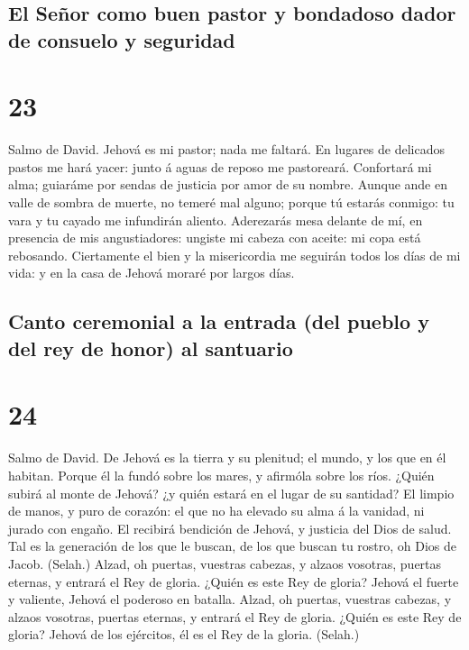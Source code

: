 \hypertarget{el-seuxf1or-como-buen-pastor-y-bondadoso-dador-de-consuelo-y-seguridad}{%
\subsection{El Señor como buen pastor y bondadoso dador de consuelo y
seguridad}\label{el-seuxf1or-como-buen-pastor-y-bondadoso-dador-de-consuelo-y-seguridad}}

\hypertarget{section-22}{%
\section{23}\label{section-22}}

 Salmo de David. Jehová es mi pastor; nada me faltará.
 En lugares de delicados pastos me hará yacer: junto á
aguas de reposo me pastoreará.  Confortará mi alma;
guiaráme por sendas de justicia por amor de su nombre. 
Aunque ande en valle de sombra de muerte, no temeré mal alguno; porque
tú estarás conmigo: tu vara y tu cayado me infundirán aliento.
 Aderezarás mesa delante de mí, en presencia de mis
angustiadores: ungiste mi cabeza con aceite: mi copa está rebosando.
 Ciertamente el bien y la misericordia me seguirán todos
los días de mi vida: y en la casa de Jehová moraré por largos días.

\hypertarget{canto-ceremonial-a-la-entrada-del-pueblo-y-del-rey-de-honor-al-santuario}{%
\subsection{Canto ceremonial a la entrada (del pueblo y del rey de
honor) al
santuario}\label{canto-ceremonial-a-la-entrada-del-pueblo-y-del-rey-de-honor-al-santuario}}

\hypertarget{section-23}{%
\section{24}\label{section-23}}

 Salmo de David. De Jehová es la tierra y su plenitud; el
mundo, y los que en él habitan.  Porque él la fundó sobre
los mares, y afirmóla sobre los ríos.  ¿Quién subirá al
monte de Jehová? ¿y quién estará en el lugar de su santidad?
 El limpio de manos, y puro de corazón: el que no ha
elevado su alma á la vanidad, ni jurado con engaño.  El
recibirá bendición de Jehová, y justicia del Dios de salud.
 Tal es la generación de los que le buscan, de los que
buscan tu rostro, oh Dios de Jacob. (Selah.)  Alzad, oh
puertas, vuestras cabezas, y alzaos vosotras, puertas eternas, y entrará
el Rey de gloria.  ¿Quién es este Rey de gloria? Jehová el
fuerte y valiente, Jehová el poderoso en batalla.  Alzad,
oh puertas, vuestras cabezas, y alzaos vosotras, puertas eternas, y
entrará el Rey de gloria.  ¿Quién es este Rey de gloria?
Jehová de los ejércitos, él es el Rey de la gloria. (Selah.)

